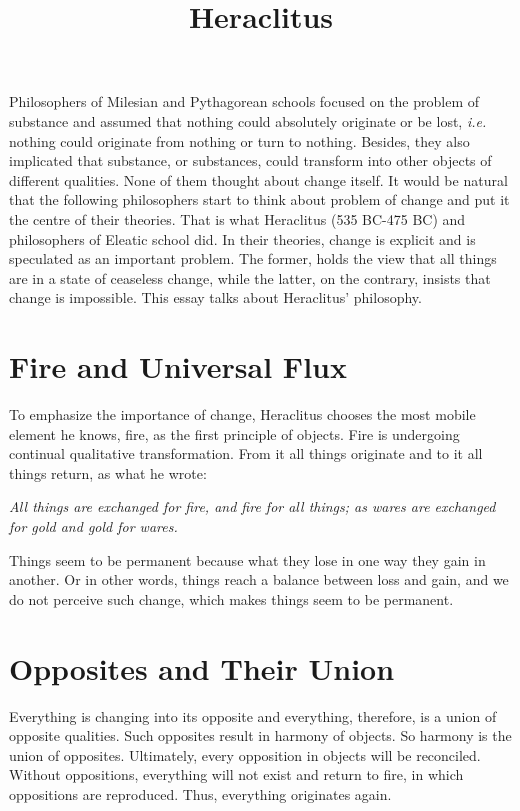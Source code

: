 \documentclass[11pt]{article}
\title{Heraclitus}
\date{}
\begin{document}
  \maketitle

  \linenumbers

Philosophers of Milesian and Pythagorean schools focused on the problem of substance and assumed that nothing could absolutely originate or be lost, \textit{i.e.} nothing could originate from nothing or turn to nothing. 
Besides, they also implicated that substance, or substances, could transform into other objects of different qualities. 
None of them thought about change itself. 
It would be natural that the following philosophers start to think about problem of change and put it the centre of their theories. 
That is what Heraclitus (535 BC-475 BC) and philosophers of Eleatic school did. 
In their theories, change is explicit and is speculated as an important problem. 
The former, holds the view that all things are in a state of ceaseless change, while the latter, on the contrary, insists that change is impossible. 
This essay talks about Heraclitus' philosophy.

\section{Fire and Universal Flux}
To emphasize the importance of change, Heraclitus chooses the most mobile element he knows, fire, as the first principle of objects. 
Fire is undergoing continual qualitative transformation. 
From it all things originate and to it all things return, as what he wrote:

\textit{All things are exchanged for fire, and fire for all things; as wares are exchanged for gold and gold for wares.}

\newline

Things seem to be permanent because what they lose in one way they gain in another. 
Or in other words, things reach a balance between loss and gain, and we do not perceive such change, which makes things seem to be permanent.

\section{Opposites and Their Union}
Everything is changing into its opposite and everything, therefore, is a union of opposite qualities. 
Such opposites result in harmony of objects. 
So harmony is the union of opposites. 
Ultimately, every opposition in objects will be reconciled. 
Without oppositions, everything will not exist and return to fire, in which oppositions are reproduced. 
Thus, everything originates again.
\end{document}
